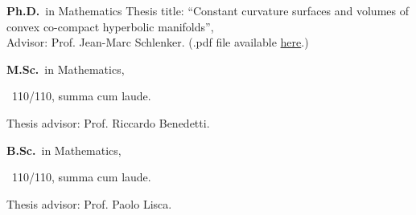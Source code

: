 	{%
		\textbf{Ph.D.}~in Mathematics}
	{%
	Thesis title: ``Constant curvature surfaces and volumes of convex co-compact hyperbolic manifolds'', \\
	Advisor: Prof. Jean-Marc Schlenker. (.pdf file available \href{https://orbilu.uni.lu/handle/10993/43901}{here}.)}

\vspace{-1em}
		{%
			\textbf{M.Sc.}~in Mathematics, \begin{footnotesize}
			~110/110, summa cum laude.
		\end{footnotesize}}
		{Thesis advisor: Prof. Riccardo Benedetti.}

\vspace{-1em}
{%
	\textbf{B.Sc.}~in Mathematics, \begin{footnotesize}
	~110/110, summa cum laude.
\end{footnotesize}}{Thesis advisor: Prof. Paolo Lisca.}